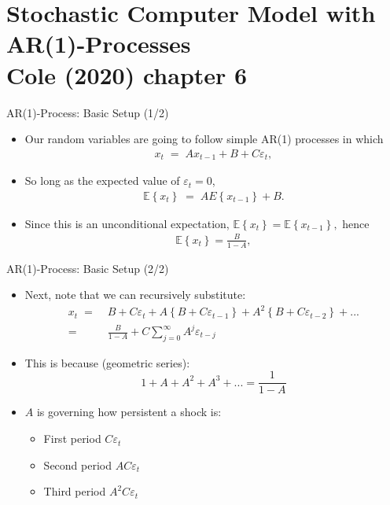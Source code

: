 \documentclass[10pt,c,aspectratio=1610,handout]{beamer}
\begin{document}
\section{Stochastic Computer Model with AR(1)-Processes\\{\small Cole (2020) chapter 6}}%
\begin{frame}{AR(1)-Process: Basic Setup (1/2)}%
  \begin{itemize}%
    \item[$\blacktriangleright$] Our random variables are going to follow simple AR(1) processes in which%
    \begin{align*}%
      x_{t} \; = \; Ax_{t-1}+B+C\varepsilon _{t},%
    \end{align*}%
    \pause%
    \item[$\blacktriangleright$] So long as the expected value of $\varepsilon _{t}=0$,%
    \begin{align*}%
      \mathbb{E} \left\{ x_{t}\right\} \; = \; A E \left\{ x_{t-1}\right\} +B.%
    \end{align*}%
    \pause%
    \item[$\blacktriangleright$] Since this is an unconditional expectation, $\mathbb{E}\left\{%
    x_{t}\right\} = \mathbb{E} \left\{ x_{t-1}\right\},$ hence%
    \begin{align*}%
    \mathbb{E} \left\{ x_{t}\right\} =\frac{B}{1-A},%
    \end{align*}%
  \end{itemize}%
\end{frame}%
\begin{frame}{AR(1)-Process: Basic Setup (2/2)}%
  \begin{itemize}%
    \item[$\blacktriangleright$] Next, note that we can recursively substitute:%
    \begin{align*}%
      x_{t} \; = & \; B+C\varepsilon _{t}+A\left\{ B+C\varepsilon _{t-1}\right\}+A^{2}\left\{ B+C\varepsilon _{t-2}\right\} +... \\%
      = & \; \frac{B}{1-A}+C\sum_{j=0}^{\infty }A^{j}\varepsilon _{t-j}%
    \end{align*}%
    \pause%
    \item[$\blacktriangleright$] This is because {\footnotesize(geometric series)}: \[ 1 + A + A^2 + A^3 + ... = \frac{1}{1-A} \]%
    \pause%
    \item[$\blacktriangleright$] $A$ is governing how persistent a shock is:%
    \begin{itemize}%
	    \item[$\rightarrow$] First period $C\varepsilon _{t}$%
	    \item[$\rightarrow$] Second period $AC\varepsilon _{t}$%
	    \item[$\rightarrow$] Third period $A^2C\varepsilon _{t}$%
    \end{itemize}%
  \end{itemize}%
\end{frame}%
\end{document}
